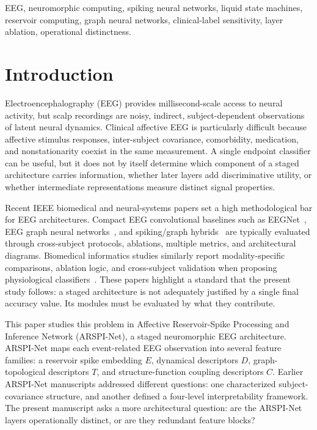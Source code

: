 \documentclass[journal]{IEEEtran}
\begin{document}
\begin{IEEEkeywords}
EEG, neuromorphic computing, spiking neural networks, liquid state machines, reservoir computing, graph neural networks, clinical-label sensitivity, layer ablation, operational distinctness.
\end{IEEEkeywords}

\section{Introduction}
Electroencephalography (EEG) provides millisecond-scale access to neural activity, but scalp recordings are noisy, indirect, subject-dependent observations of latent neural dynamics. Clinical affective EEG is particularly difficult because affective stimulus responses, inter-subject covariance, comorbidity, medication, and nonstationarity coexist in the same measurement. A single endpoint classifier can be useful, but it does not by itself determine which component of a staged architecture carries information, whether later layers add discriminative utility, or whether intermediate representations measure distinct signal properties.

Recent IEEE biomedical and neural-systems papers set a high methodological bar for EEG architectures. Compact EEG convolutional baselines such as EEGNet~\cite{lawhern2018eegnet}, EEG graph neural networks~\cite{klepl2024gnn,klepl2023ad}, and spiking/graph hybrids~\cite{gong2023sglnet} are typically evaluated through cross-subject protocols, ablations, multiple metrics, and architectural diagrams. Biomedical informatics studies similarly report modality-specific comparisons, ablation logic, and cross-subject validation when proposing physiological classifiers~\cite{guo2025mma,chiang2023depression}. These papers highlight a standard that the present study follows: a staged architecture is not adequately justified by a single final accuracy value. Its modules must be evaluated by what they contribute.

This paper studies this problem in Affective Reservoir-Spike Processing and Inference Network (ARSPI-Net), a staged neuromorphic EEG architecture. ARSPI-Net maps each event-related EEG observation into several feature families: a reservoir spike embedding $E$, dynamical descriptors $D$, graph-topological descriptors $T$, and structure-function coupling descriptors $C$. Earlier ARSPI-Net manuscripts addressed different questions: one characterized subject-covariance structure, and another defined a four-level interpretability framework. The present manuscript asks a more architectural question: are the ARSPI-Net layers operationally distinct, or are they redundant feature blocks?
\end{document}
